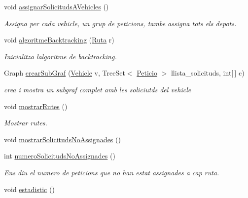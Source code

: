 \begin{DoxyCompactItemize}
void \hyperlink{class_portam_a_pro_p_1_1_controlador_a018e4628c51d9664ee54d5a125f59a61}{assignar\+Solicituds\+A\+Vehicles} ()
\begin{DoxyCompactList}\small\item\em Assigna per cada vehicle, un grup de peticions, tambe assigna tots els depots. \end{DoxyCompactList}\item 
void \hyperlink{class_portam_a_pro_p_1_1_controlador_ac27d24bc80d3ac8023ae7a84b2e2c19d}{algoritme\+Backtracking} (\hyperlink{class_portam_a_pro_p_1_1_ruta}{Ruta} r)
\begin{DoxyCompactList}\small\item\em Inicialitza l\textquotesingle{}algoritme de backtracking. \end{DoxyCompactList}\item 
Graph \hyperlink{class_portam_a_pro_p_1_1_controlador_a2a8b7fc6a14913f1e5d1c046d1201c97}{crear\+Sub\+Graf} (\hyperlink{class_portam_a_pro_p_1_1_vehicle}{Vehicle} v, Tree\+Set$<$ \hyperlink{class_portam_a_pro_p_1_1_peticio}{Peticio} $>$ llista\+\_\+solicituds, int\mbox{[}$\,$\mbox{]} c)
\begin{DoxyCompactList}\small\item\em crea i mostra un subgraf complet amb les soliciutds del vehicle \end{DoxyCompactList}\item 
void \hyperlink{class_portam_a_pro_p_1_1_controlador_ad5932831350b32e447c4156f7dc9af59}{mostrar\+Rutes} ()
\begin{DoxyCompactList}\small\item\em Mostrar rutes. \end{DoxyCompactList}\item 
void \hyperlink{class_portam_a_pro_p_1_1_controlador_a0142050a4eea8d58f003ef8ac92c6f19}{mostrar\+Solicituds\+No\+Assignades} ()
\item 
int \hyperlink{class_portam_a_pro_p_1_1_controlador_ab96141c7e6641af02d4498c35b236f7b}{numero\+Solicituds\+No\+Assignades} ()
\begin{DoxyCompactList}\small\item\em Ens diu el numero de peticions que no han estat assignades a cap ruta. \end{DoxyCompactList}\item 
void \hyperlink{class_portam_a_pro_p_1_1_controlador_a74d0ce6ad481a89209bfe2ce15ce7233}{estadistic} ()
\end{DoxyCompactItemize}


